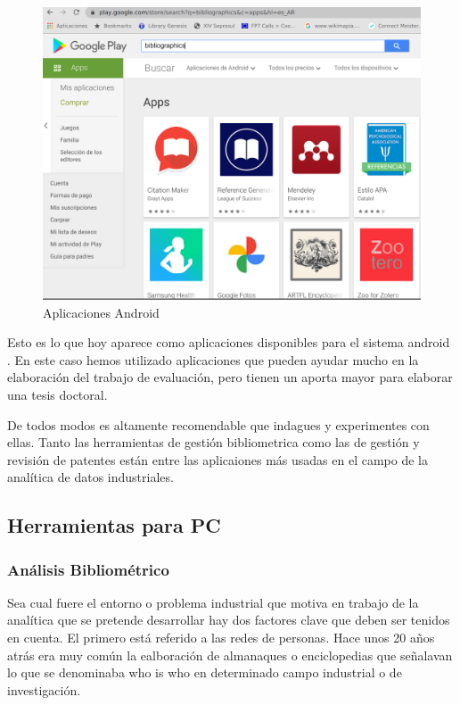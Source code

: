 \documentclass[]{article}
\begin{document}
\begin{figure}
\centering
\includegraphics{playstore.png}
\caption{Aplicaciones Android}
\end{figure}

Esto es lo que hoy aparece como aplicaciones disponibles para el sistema
android . En este caso hemos utilizado aplicaciones que pueden ayudar
mucho en la elaboración del trabajo de evaluación, pero tienen un aporta
mayor para elaborar una tesis doctoral.

De todos modos es altamente recomendable que indagues y experimentes con
ellas. Tanto las herramientas de gestión bibliometrica como las de
gestión y revisión de patentes están entre las aplicaiones más usadas en
el campo de la analítica de datos industriales.

\subsection{Herramientas para PC}\label{herramientas-para-pc}

\subsubsection{Análisis
Bibliométrico}\label{anuxe1lisis-bibliomuxe9trico}

Sea cual fuere el entorno o problema industrial que motiva en trabajo de
la analítica que se pretende desarrollar hay dos factores clave que
deben ser tenidos en cuenta. El primero está referido a las redes de
personas. Hace unos 20 años atrás era muy común la ealboración de
almanaques o enciclopedias que señalavan lo que se denominaba who is who
en determinado campo industrial o de investigación.
\end{document}

